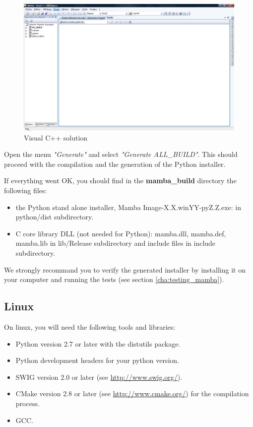 \documentclass[a4paper,10pt,oneside]{article}
\begin{document}
\begin{figure}
\centering
\includegraphics[scale=0.3]{images/visualcpp.png}
\caption{Visual C++ solution}
\label{fig:visualcpp}
\end{figure}

Open the menu \textit{"Generate"} and select \textit{"Generate ALL\_BUILD"}.
This should proceed with the compilation and the generation of the Python installer.

If everything went OK, you should find in the \textbf{mamba\_build} directory
the following files:
\begin{itemize}
\item the Python stand alone installer, Mamba Image-X.X.winYY-pyZ.Z.exe: in python/dist subdirectory.
\item C core library DLL (not needed for Python): mamba.dll, mamba.def, mamba.lib in lib/Release subdirectory
and include files in include subdirectory.
\end{itemize}

We strongly recommand you to verify the generated installer by installing it on
your computer and running the tests (see section \ref{cha:testing_mamba}).

\subsection{Linux}

On linux, you will need the following tools and libraries:

\begin{itemize}
\item Python version 2.7 or later with the distutils package.
\item Python development headers for your python version.
\item SWIG version 2.0 or later (see \url{http://www.swig.org/}).
\item CMake version 2.8 or later (see \url{http://www.cmake.org/}) for the 
compilation process.
\item GCC.
\end{itemize}
\end{document}
